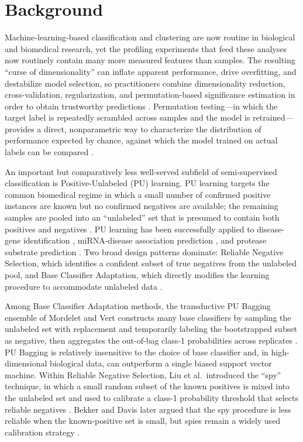 \section{Background}

Machine-learning-based classification and clustering are now routine in biological and biomedical research, yet the profiling experiments that feed these analyses now routinely contain many more measured features than samples. The resulting ``curse of dimensionality'' can inflate apparent performance, drive overfitting, and destabilize model selection, so practitioners combine dimensionality reduction, cross-validation, regularization, and permutation-based significance estimation in order to obtain trustworthy predictions \cite{harris2020numpy,virtanen2020scipy,pedregosa2011scikit}. Permutation testing---in which the target label is repeatedly scrambled across samples and the model is retrained---provides a direct, nonparametric way to characterize the distribution of performance expected by chance, against which the model trained on actual labels can be compared \cite{ojala2010permutation,breiman1996bagging}.

An important but comparatively less well-served subfield of semi-supervised classification is Positive-Unlabeled (PU) learning. PU learning targets the common biomedical regime in which a small number of confirmed positive instances are known but no confirmed negatives are available; the remaining samples are pooled into an ``unlabeled'' set that is presumed to contain both positives and negatives \cite{bekker2020pulearning,elkan2008learning,li2022pulearning}. PU learning has been successfully applied to disease-gene identification \cite{yang2014epu}, miRNA-disease association prediction \cite{wang2019nsemda}, and protease substrate prediction \cite{li2019protease}. Two broad design patterns dominate: Reliable Negative Selection, which identifies a confident subset of true negatives from the unlabeled pool, and Base Classifier Adaptation, which directly modifies the learning procedure to accommodate unlabeled data \cite{li2022pulearning}.

Among Base Classifier Adaptation methods, the transductive PU Bagging ensemble of Mordelet and Vert constructs many base classifiers by sampling the unlabeled set with replacement and temporarily labeling the bootstrapped subset as negative, then aggregates the out-of-bag class-1 probabilities across replicates \cite{mordelet2014bagging,breiman1996bagging}. PU Bagging is relatively insensitive to the choice of base classifier and, in high-dimensional biological data, can outperform a single biased support vector machine. Within Reliable Negative Selection, Liu et al.\ introduced the ``spy'' technique, in which a small random subset of the known positives is mixed into the unlabeled set and used to calibrate a class-1 probability threshold that selects reliable negatives \cite{liu2003spy}. Bekker and Davis later argued that the spy procedure is less reliable when the known-positive set is small, but spies remain a widely used calibration strategy \cite{bekker2020pulearning}.

